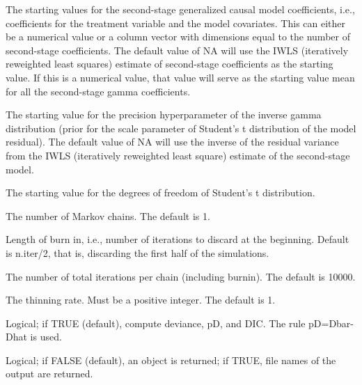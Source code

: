 \documentclass[a4paper]{book}
\begin{document}
\begin{Arguments}
\begin{ldescription}
\item[\code{gamma.start}] The starting values for the second-stage generalized causal model coefficients,
i.e., coefficients for the treatment variable and the model covariates.
This can either be a numerical value or a column vector with dimensions
equal to the number of second-stage coefficients.
The default value of NA will use the IWLS (iteratively reweighted least squares) estimate
of second-stage coefficients as the starting value.
If this is a numerical value, that value will
serve as the starting value mean for all the second-stage gamma coefficients.

\item[\code{e.start}] The starting value for the precision hyperparameter of the inverse gamma distribution
(prior for the scale parameter of Student's t distribution of the model residual).
The default value of NA will use the inverse of the residual variance from the
IWLS (iteratively reweighted least square) estimate of the second-stage model.

\item[\code{df.start}] The starting value for the degrees of freedom of Student's t distribution.

\item[\code{n.chains}] The number of Markov chains. The default is 1.

\item[\code{n.burnin}] Length of burn in, i.e., number of iterations to discard at the beginning.
Default is n.iter/2, that is, discarding the first half of the simulations.

\item[\code{n.iter}] The number of total iterations per chain (including burnin). The default is 10000.

\item[\code{n.thin}] The thinning rate. Must be a positive integer. The default is 1.

\item[\code{DIC}] Logical; if TRUE (default), compute deviance, pD, and DIC. The rule pD=Dbar-Dhat is used.

\item[\code{codaPkg}] Logical; if FALSE (default), an object is returned; if TRUE,
file names of the output are returned.
\end{ldescription}
\end{Arguments}
%
\end{document}
